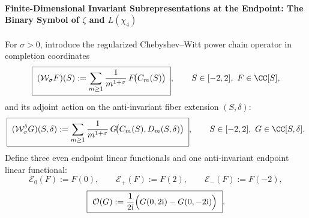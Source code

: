 \paragraph{Finite-Dimensional Invariant Subrepresentations at the Endpoint: The Binary Symbol of \texorpdfstring{$\zeta$}{zeta} and \texorpdfstring{$L(\chi_{4})$}{L(chi4)}}
For \(\sigma>0\), introduce the regularized Chebyshev--Witt power chain operator in completion coordinates
\begin{equation}\label{eq:endpoint-Wsigma-even}
\boxed{\;
(\mathcal W_{\sigma}F)(S):=\sum_{m\ge 1}\frac{1}{m^{1+\sigma}}\,F\!\bigl(C_m(S)\bigr)\; },
\qquad S\in[-2,2],\ F\in\CC[S],
\end{equation}
and its adjoint action on the anti-invariant fiber extension \((S,\delta)\):
\begin{equation}\label{eq:endpoint-Wsigma-odd}
\boxed{\;
(\mathcal W_{\sigma}^{\delta}G)(S,\delta):=\sum_{m\ge 1}\frac{1}{m^{1+\sigma}}\,G\!\bigl(C_m(S),D_m(S,\delta)\bigr)\; },
\qquad S\in[-2,2],\ G\in\CC[S,\delta].
\end{equation}
Define three even endpoint linear functionals and one anti-invariant endpoint linear functional:
\[
\mathcal E_{0}(F):=F(0),\qquad \mathcal E_{+}(F):=F(2),\qquad \mathcal E_{-}(F):=F(-2),
\]
\begin{equation}\label{eq:endpoint-odd-functional-O}
\boxed{\ \mathcal O(G):=\frac{1}{2\mathrm{i}}\Bigl(G(0,2\mathrm{i})-G(0,-2\mathrm{i})\Bigr)\ }.
\end{equation}

